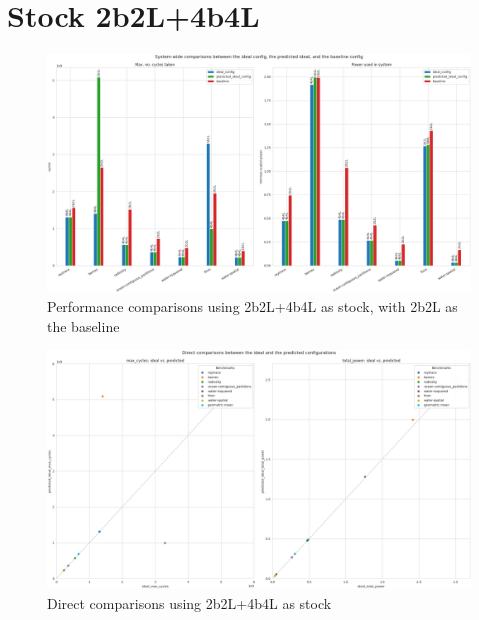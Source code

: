 \section{Stock 2b2L+4b4L}
\begin{figure}[H]
    \centering
    \includegraphics[height=0.4\textheight]{result-plots/stock-2b2L-4b4L/system-bars.png}
    \caption{Performance comparisons using 2b2L+4b4L as stock, with 2b2L as the
             baseline}
\end{figure}

\begin{figure}[H]
    \centering
    \includegraphics[height=0.4\textheight]{result-plots/stock-2b2L-4b4L/system-scatter.png}
    \caption{Direct comparisons using 2b2L+4b4L as stock}
\end{figure}
